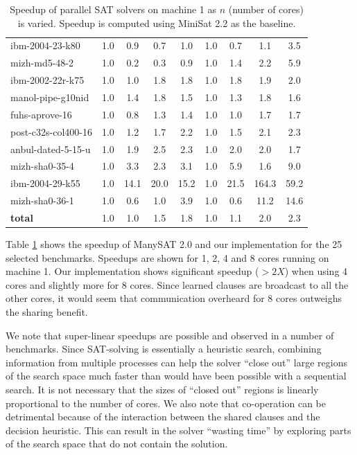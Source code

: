 \documentclass[letterpaper, compsoc, conference]{IEEEtran}
\begin{document}
\begin{table}[htbp]
\begin{center}
\begin{tabular}{|l|c|c|c|c|c|c|c|c|}
        ibm-2004-23-k80                    &       1.0 &  0.9 &  0.7 &  1.0 &  1.0 &  0.7 &  1.1 &  3.5 \\
        mizh-md5-48-2                      &       1.0 &  0.2 &  0.3 &  0.9 &  1.0 &  1.4 &  2.2 &  5.9 \\
        ibm-2002-22r-k75                   &       1.0 &  1.0 &  1.8 &  1.8 &  1.0 &  1.8 &  1.9 &  2.0 \\
        manol-pipe-g10nid                  &       1.0 &  1.4 &  1.8 &  1.5 &  1.0 &  1.3 &  1.8 &  1.6 \\
        fuhs-aprove-16                     &       1.0 &  0.8 &  1.3 &  1.4 &  1.0 &  1.0 &  1.7 &  1.7 \\
        post-c32s-col400-16                &       1.0 &  1.2 &  1.7 &  2.2 &  1.0 &  1.5 &  2.1 &  2.3 \\
        anbul-dated-5-15-u                 &       1.0 &  1.9 &  2.5 &  2.3 &  1.0 &  2.0 &  2.0 &  1.7 \\
        mizh-sha0-35-4                     &       1.0 &  3.3 &  2.3 &  3.1 &  1.0 &  5.9 &  1.6 &  9.0 \\
        ibm-2004-29-k55                    &       1.0 & 14.1 & 20.0 & 15.2 &  1.0 & 21.5 &164.3 & 59.2 \\
        mizh-sha0-36-1                     &       1.0 &  0.6 &  1.0 &  3.9 &  1.0 &  0.6 & 11.2 & 14.6 \\
        \hline
        \textbf{total}                     &       1.0 &  1.0 &  1.5 &  1.8 &  1.0 &  1.1 &  2.0 &  2.3 \\
        \hline
    \end{tabular}
    \end{center}
    \caption{Speedup of parallel SAT solvers on machine 1 as $n$ (number of
    cores) is varied. Speedup is computed using MiniSat 2.2 as the baseline. }
    \label{tab:speedup}
\end{table}

Table \ref{tab:speedup} shows the speedup of ManySAT 2.0 and our implementation
for the 25 selected benchmarks. Speedups are shown for 1, 2, 4 and 8 cores
running on machine 1.  Our implementation shows significant speedup ($>2X$)
when using 4 cores and slightly more for 8 cores. Since learned clauses are
broadcast to all the other cores, it would seem that communication overheard
for 8 cores outweighs the sharing benefit. 

We note that super-linear speedups are possible and observed in a number of
benchmarks.  Since SAT-solving is essentially a heuristic search, combining
information from multiple processes can help the solver ``close out'' large
regions of the search space much faster than would have been possible with a
sequential search. It is not necessary that the sizes of ``closed out'' regions
is linearly proportional to the number of cores. We also note that co-operation
can be detrimental because of the interaction between the shared clauses and
the decision heuristic.  This can result in the solver ``wasting time'' by
exploring parts of the search space that do not contain the solution.
\end{document}
